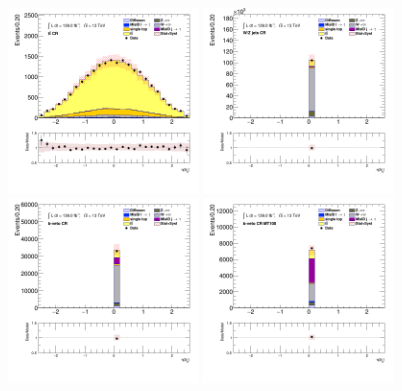 		\begin{figure}[!htp]
			\begin{center}    
			\includegraphics[width=0.45\textwidth]{chapters/chapter6_HPlus/images/taujets/bjet_0_eta_TTBAR.png}
			\includegraphics[width=0.45\textwidth]{chapters/chapter6_HPlus/images/taujets/bjet_0_eta_WJETS.png} \\
			\includegraphics[width=0.45\textwidth]{chapters/chapter6_HPlus/images/taujets/bjet_0_eta_BVETO.png}
			\includegraphics[width=0.45\textwidth]{chapters/chapter6_HPlus/images/taujets/bjet_0_eta_BVETO_MT100.png} \\

\end{center}
\end{figure}
